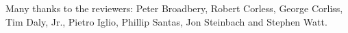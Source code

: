 Many thanks to the reviewers:
Peter Broadbery,
Robert Corless,
George Corliss,
Tim Daly, Jr.,
Pietro Iglio,
Phillip Santas,
Jon Steinbach and
Stephen Watt.
%
%
%
%
%
%
%
%
%
